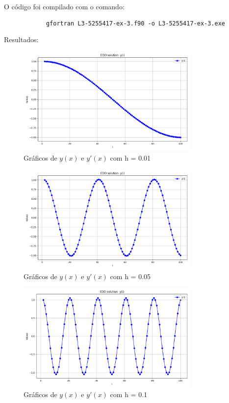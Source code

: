 \documentclass[12pt, a4paper]{article} %
\begin{document}
        O c\'odigo foi compilado com o comando:
        \begin{verbatim}
            gfortran L3-5255417-ex-3.f90 -o L3-5255417-ex-3.exe
        \end{verbatim}

        Resultados:
        \begin{figure}[H]
            \centering
            \includegraphics[width=0.8\textwidth]{../images/results-ex-3-2.png}
            \caption{Gr\'aficos de $y(x)$ e $y'(x)$ com h = 0.01}
        \end{figure}
        \begin{figure}[H]
            \centering
            \includegraphics[width=0.8\textwidth]{../images/results-ex-3-4.png}
            \caption{Gr\'aficos de $y(x)$ e $y'(x)$ com h = 0.05}
        \end{figure}
        \begin{figure}[H]
            \centering
            \includegraphics[width=0.8\textwidth]{../images/results-ex-3-1.png}
            \caption{Gr\'aficos de $y(x)$ e $y'(x)$ com h = 0.1}
        \end{figure}
\end{document}
